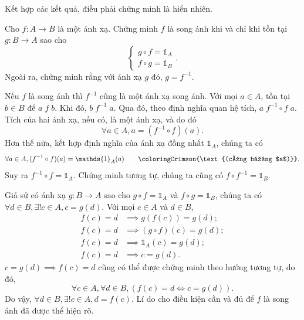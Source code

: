 Kết hợp các kết quả, điều phải chứng minh là hiển nhiên.

\exercise Cho $f: A \to B$ là một ánh xạ. Chứng minh $f$ là song ánh khi và chỉ khi tồn tại $g: B \to A$ sao cho \begin{equation*}
   \begin{cases}
      g \circ f = \mathds{1}_A \\
   f \circ g = \mathds{1}_B
   \end{cases}.
\end{equation*} Ngoài ra, chứng minh rằng với ánh xạ $g$ đó, $g = f^{-1}$.

\solution

Nếu $f$ là song ánh thì $f^{-1}$ cũng là một ánh xạ song ánh. Với mọi $a \in A$, tồn tại $b \in B$ để $a\;f\;b$. Khi đó, $b\;f^{-1}\;a$. Qua đó, theo định nghĩa quan hệ tích, $a\;f^{-1}\circ f\;a$. Tích của hai ánh xạ, nếu có, là một ánh xạ, và do đó \begin{equation*}
   \forall a \in A, a = (f^{-1}\circ f)(a).
\end{equation*}
Hơn thế nữa, kết hợp định nghĩa của ánh xạ đồng nhất $\mathds{1}_A$, chúng ta có
\begin{equation*}
   \forall a \in A, (f^{-1}\circ f)(a) = \mathds{1}_A(a) \qquad \coloringCrimson{\text{(cùng bằng $a$)}}.
\end{equation*}
Suy ra $f^{-1}\circ f = \mathds{1}_A$. Chứng minh tương tự, chúng ta cũng có $f\circ f^{-1} = \mathds{1}_B$.

Giả sử có ánh xạ $g: B \to A$ sao cho $g \circ f = \mathds{1}_A$ và $f \circ g = \mathds{1}_B$, chúng ta có $\forall d \in B, \exists ! c \in A, c = g(d) $. Với mọi $c \in A$ và $d \in B$, 
\begin{align*}
   f(c) = d &\implies g(f(c)) = g(d); \\
   f(c) = d &\implies (g \circ f)(c) = g(d); \\
   f(c) = d &\implies \mathds{1}_A(c) = g(d); \\
   f(c) = d &\implies c = g(d).
\end{align*}
$c = g(d) \implies f(c) = d$ cũng có thể được chứng minh theo hướng tương tự, do đó, 
\begin{equation*}
   \forall c \in A, \forall d \in B, (f(c) = d \iff c = g(d)). 
\end{equation*}
Do vậy, $\forall d \in B, \exists ! c \in A, d = f(c)$. Lí do cho điều kiện cần và đủ để $f$ là song ánh đã được thể hiện rõ.

